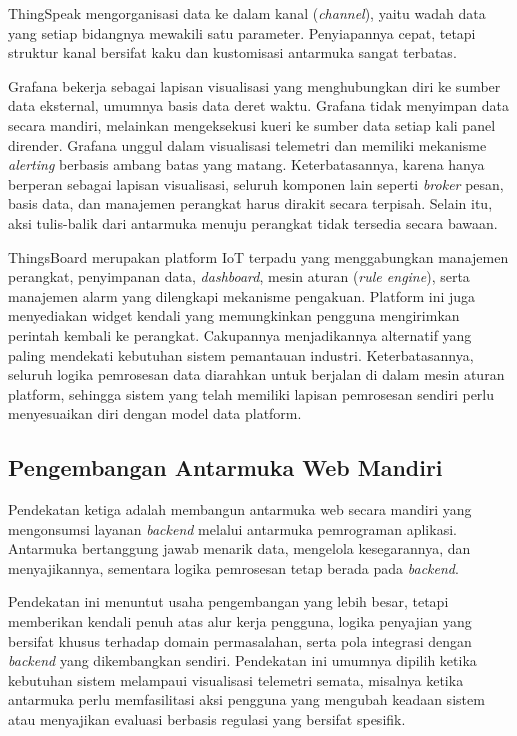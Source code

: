 ThingSpeak mengorganisasi data ke dalam kanal (\textit{channel}), yaitu wadah data yang setiap bidangnya mewakili
satu parameter. Penyiapannya cepat, tetapi struktur kanal bersifat kaku dan kustomisasi antarmuka sangat terbatas.

Grafana bekerja sebagai lapisan visualisasi yang menghubungkan diri ke sumber data eksternal, umumnya basis data
deret waktu. Grafana tidak menyimpan data secara mandiri, melainkan mengeksekusi kueri ke sumber data setiap kali
panel dirender. Grafana unggul dalam visualisasi telemetri dan memiliki mekanisme \textit{alerting} berbasis
ambang batas yang matang. Keterbatasannya, karena hanya berperan sebagai lapisan visualisasi, seluruh komponen
lain seperti \textit{broker} pesan, basis data, dan manajemen perangkat harus dirakit secara terpisah. Selain itu,
aksi tulis-balik dari antarmuka menuju perangkat tidak tersedia secara bawaan.

ThingsBoard merupakan platform IoT terpadu yang menggabungkan manajemen perangkat, penyimpanan data,
\textit{dashboard}, mesin aturan (\textit{rule engine}), serta manajemen alarm yang dilengkapi mekanisme
pengakuan. Platform ini juga menyediakan widget kendali yang memungkinkan pengguna mengirimkan perintah kembali ke
perangkat. Cakupannya menjadikannya alternatif yang paling mendekati kebutuhan sistem pemantauan industri.
Keterbatasannya, seluruh logika pemrosesan data diarahkan untuk berjalan di dalam mesin aturan platform, sehingga
sistem yang telah memiliki lapisan pemrosesan sendiri perlu menyesuaikan diri dengan model data platform.

\subsection{Pengembangan Antarmuka Web Mandiri}
Pendekatan ketiga adalah membangun antarmuka web secara mandiri yang mengonsumsi layanan \textit{backend} melalui
antarmuka pemrograman aplikasi. Antarmuka bertanggung jawab menarik data, mengelola kesegarannya, dan
menyajikannya, sementara logika pemrosesan tetap berada pada \textit{backend}.

Pendekatan ini menuntut usaha pengembangan yang lebih besar, tetapi memberikan kendali penuh atas alur kerja
pengguna, logika penyajian yang bersifat khusus terhadap domain permasalahan, serta pola integrasi dengan
\textit{backend} yang dikembangkan sendiri. Pendekatan ini umumnya dipilih ketika kebutuhan sistem melampaui
visualisasi telemetri semata, misalnya ketika antarmuka perlu memfasilitasi aksi pengguna yang mengubah keadaan
sistem atau menyajikan evaluasi berbasis regulasi yang bersifat spesifik.

